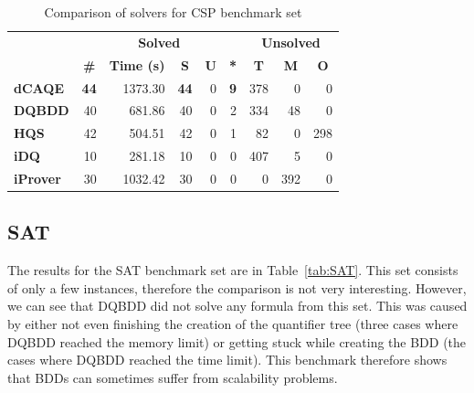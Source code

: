 \documentclass[
  digital, %
  color,
  twoside, %
  table,   %
  nolof,     %
  nolot,     %
]{fithesis3}
\theoremstyle{definition}
\theoremstyle{remark}
\begin{document}
\begin{table}[ht]
\centering
\caption{Comparison of solvers for CSP benchmark set}%
\label{tab:CSP}
\begin{tabular}{|l|r|r|r|r|r|r|r|r|}
\hline
\multicolumn{1}{|c|}{}                                  & \multicolumn{5}{c|}{\textbf{Solved}}                                                                                                                                        & \multicolumn{3}{c|}{\textbf{Unsolved}}                                                                 \\  \hhline{~*{8}{-}}
\multicolumn{1}{|c|}{\multirow{-2}{*}{\textbf{Solver}}} & \multicolumn{1}{c|}{\textbf{\#}} & \multicolumn{1}{c|}{\textbf{Time (s)}} & \multicolumn{1}{c|}{\textbf{S}} & \multicolumn{1}{c|}{\textbf{U}} & \multicolumn{1}{c|}{\textbf{*}} & \multicolumn{1}{c|}{\textbf{T}} & \multicolumn{1}{c|}{\textbf{M}} & \multicolumn{1}{c|}{\textbf{O}} \\ \hline
\textbf{dCAQE} & \phantom{0}\textbf{44} & \num{1373.30} & \phantom{0}\textbf{44} & \phantom{00}\num{0} & \phantom{00}\textbf{9} & \num{378} & \num{0} & \num{0} \\ \hline
\textbf{DQBDD} & \num{40} & \num{681.86} & \num{40} & \num{0} & \num{2} & \num{334} & \num{48} & \num{0} \\ \hline
\textbf{HQS} & \num{42} & \num{504.51} & \num{42} & \num{0} & \num{1} & \num{82} & \num{0} & \num{298} \\ \hline
\textbf{iDQ} & \num{10} & \num{281.18} & \num{10} & \num{0} & \num{0} & \num{407} & \num{5} & \num{0} \\ \hline
\textbf{iProver} & \num{30} & \num{1032.42} & \num{30} & \num{0} & \num{0} & \num{0} & \num{392} & \num{0} \\ \hline
\end{tabular}
\end{table}


\subsection{SAT}
The results for the SAT benchmark set are in Table~\ref{tab:SAT}. This set consists of only a few instances, therefore the comparison is not very interesting. However, we can see that DQBDD did not solve any formula from this set. This was caused by either not even finishing the creation of the quantifier tree (three cases where DQBDD reached the memory limit) or getting stuck while creating the BDD (the cases where DQBDD reached the time limit). This benchmark therefore shows that BDDs can sometimes suffer from scalability problems.
\end{document}
